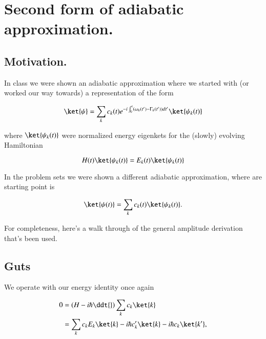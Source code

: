 %
%

\chapter{Second form of adiabatic approximation.}
\label{chap:adiabaticApproximation}
{}
\date{Dec 11, 2011}

\beginArtWithToc

\section{Motivation.}

In class we were shown an adiabatic approximation where we started with (or worked our way towards) a representation of the form

\begin{equation}\label{eqn:adiabaticApproximation:10}
\ket{\psi} = \sum_k c_k(t) e^{-i \int_0^t (\omega_k(t') - \Gamma_k(t')) dt' } \ket{\psi_k(t)}
\end{equation}

where $\ket{\psi_k(t)}$ were normalized energy eigenkets for the (slowly) evolving Hamiltonian

\begin{equation}\label{eqn:adiabaticApproximation:30}
H(t) \ket{\psi_k(t)} = E_k(t) \ket{\psi_k(t)}
\end{equation}

In the problem sets we were shown a different adiabatic approximation, where are starting point is 

\begin{equation}\label{eqn:adiabaticApproximation:50}
\ket{\psi(t)} = \sum_k c_k(t) \ket{\psi_k(t)}.
\end{equation}

For completeness, here's a walk through of the general amplitude derivation that's been used.

\section{Guts}

We operate with our energy identity once again

\begin{align*}
0 
&=
\left(H - i \hbar \ddt{} \right) \sum_k c_k \ket{k} \\
&=
\sum_k c_k E_k \ket{k} - i \hbar c_k' \ket{k} - i \hbar c_k \ket{k'} ,
\end{align*}

